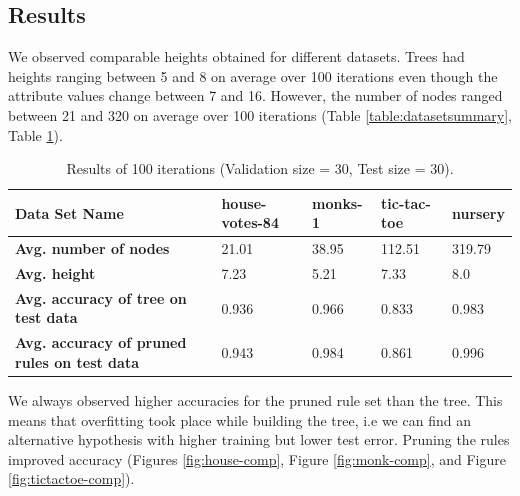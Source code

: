 \documentclass[12pt]{article}
\begin{document}
\subsection{Results}
We observed comparable heights obtained for different datasets. Trees
had heights ranging between 5 and 8 on average over 100 iterations
even though the attribute values change between 7 and 16. However, the
number of nodes ranged between 21 and 320 on average over 100
iterations (Table \ref{table:datasetsummary}, Table \ref{table:performance}).

\begin{table}[H]
  \centering
  \begin{small}
    \begin{tabular}{|l|l|l|l|l|}
      \hline
      \textbf{Data Set Name}                           & house-votes-84 & monks-1 & tic-tac-toe & nursery \\ \hline
      \textbf{Avg. number of nodes}                           & 21.01                   & 38.95            & 112.51               & 319.79           \\ \hline
      \textbf{Avg. height}                                & 7.23                    & 5.21             & 7.33                 & 8.0                \\ \hline
      \textbf{Avg. accuracy of tree on test data}         & 0.936                   & 0.966            & 0.833                & 0.983            \\ \hline
      \textbf{Avg. accuracy of pruned rules on test data} & 0.943                   & 0.984            & 0.861                & 0.996            \\ \hline
    \end{tabular}
\end{small}
\caption{Results of 100 iterations (Validation size = 30, Test size = 30).}
\label{table:performance}
\end{table}

We always observed higher accuracies for the pruned rule set than the
tree. This means that overfitting took place while building the tree,
i.e we can find an alternative hypothesis with higher training but
lower test error. Pruning the rules improved accuracy (Figures
\ref{fig:house-comp}, Figure \ref{fig:monk-comp}, and Figure
\ref{fig:tictactoe-comp}).
\end{document}

